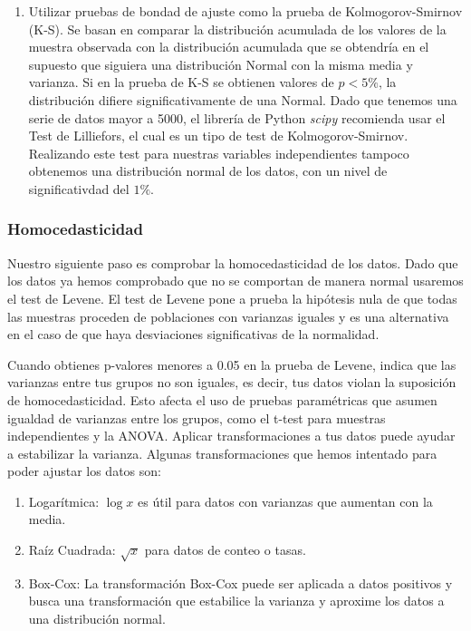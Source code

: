 \documentclass{article}
\begin{document}
\begin{enumerate}
    \item Utilizar pruebas de bondad de ajuste como la prueba de Kolmogorov-Smirnov (K-S). Se basan en comparar la distribución acumulada de los valores de la muestra observada con la distribución acumulada que se obtendría en el supuesto que siguiera una distribución Normal con la misma media y varianza. Si en la prueba de K-S se obtienen valores de $p<5\%$, la distribución difiere significativamente de una Normal. Dado que tenemos una serie de datos mayor a 5000, el librería de Python \textit{scipy} recomienda usar el Test de Lilliefors, el cual es un tipo de test de Kolmogorov-Smirnov. Realizando este test para nuestras variables independientes tampoco obtenemos una distribución normal de los datos, con un nivel de significativdad del $1\%$.
\end{enumerate}

\subsubsection{Homocedasticidad}
Nuestro siguiente paso es comprobar la homocedasticidad de los datos. Dado que los datos ya hemos comprobado que no se comportan de manera normal usaremos el test de Levene. El test de Levene pone a prueba la hipótesis nula de que todas las muestras proceden de poblaciones con varianzas iguales y es una alternativa en el caso de que haya desviaciones significativas de la normalidad. 

Cuando obtienes p-valores menores a 0.05 en la prueba de Levene, indica que las varianzas entre tus grupos no son iguales, es decir, tus datos violan la suposición de homocedasticidad. Esto afecta el uso de pruebas paramétricas que asumen igualdad de varianzas entre los grupos, como el t-test para muestras independientes y la ANOVA.  Aplicar transformaciones a tus datos puede ayudar a estabilizar la varianza. Algunas transformaciones que hemos intentado para poder ajustar los datos son:

\begin{enumerate}
    \item Logarítmica: $\log{x}$ es útil para datos con varianzas que aumentan con la media.
    \item Raíz Cuadrada: $\sqrt{x}$ para datos de conteo o tasas.
    \item Box-Cox: La transformación Box-Cox puede ser aplicada a datos positivos y busca una transformación que estabilice la varianza y aproxime los datos a una distribución normal.
\end{enumerate}
\end{document}
